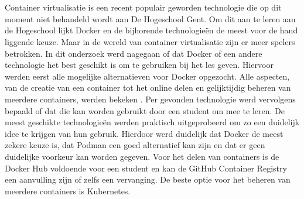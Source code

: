 
%
%

%



\chapter*{}

Container virtualisatie is een recent populair geworden technologie die op dit moment niet behandeld wordt aan De Hogeschool Gent. Om dit aan te leren aan de Hogeschool lijkt Docker en de bijhorende technologieën de meest voor de hand liggende keuze. Maar in de wereld van container virtualisatie zijn er meer spelers betrokken. In dit onderzoek werd nagegaan of dat Docker of een andere technologie het best geschikt is om te gebruiken bij het les geven. Hiervoor werden eerst alle mogelijke alternatieven voor Docker opgezocht.  Alle aspecten, van de creatie van een container tot het online delen en gelijktijdig beheren van meerdere containers, werden bekeken . Per gevonden technologie werd vervolgens bepaald of dat die kan worden gebruikt door een student om mee te leren. De meest geschikte technologieën werden praktisch uitgeprobeerd om zo een duidelijk idee te krijgen van hun gebruik. Hierdoor werd duidelijk dat Docker de meest zekere keuze is, dat Podman een goed alternatief kan zijn en dat er geen duidelijke voorkeur kan worden gegeven. Voor het delen van containers is de Docker Hub voldoende voor een student en kan de GitHub Container Registry een aanvulling zijn of zelfs een vervanging. De beste optie voor het beheren van meerdere containers is Kubernetes.
